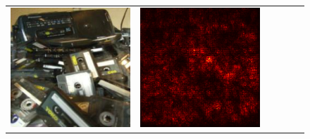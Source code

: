 \documentclass[preprint,12pt]{elsarticle}
\begin{document}
\begin{figure}[ht]
\begin{tabular}{cccccc}
  \includegraphics[scale=\scale]{../visualizations/examples/imagenette/resnet18/images/2.png} &
  \includegraphics[scale=\scale]{../visualizations/examples/imagenette/resnet18/saliency_map/2.png} & 

\end{tabular}
\end{figure}
\end{document}
